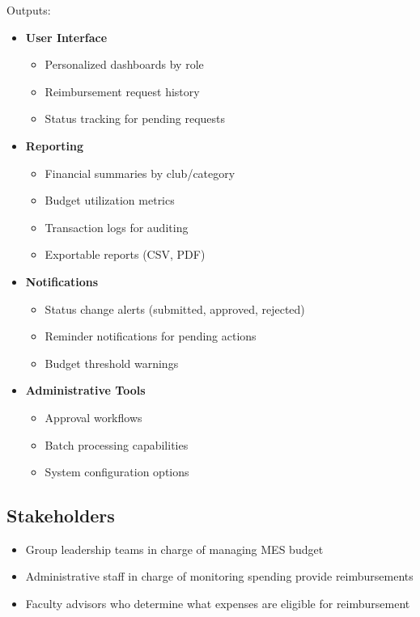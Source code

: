 \documentclass{article}
\begin{document}
Outputs:
\begin{itemize}
  \item \textbf{User Interface}
    \begin{itemize}
      \item Personalized dashboards by role
      \item Reimbursement request history
      \item Status tracking for pending requests
    \end{itemize}
  \item \textbf{Reporting}
    \begin{itemize}
      \item Financial summaries by club/category
      \item Budget utilization metrics
      \item Transaction logs for auditing
      \item Exportable reports (CSV, PDF)
    \end{itemize}
  \item \textbf{Notifications}
    \begin{itemize}
      \item Status change alerts (submitted, approved, rejected)
      \item Reminder notifications for pending actions
      \item Budget threshold warnings
    \end{itemize}
  \item \textbf{Administrative Tools}
    \begin{itemize}
      \item Approval workflows
      \item Batch processing capabilities
      \item System configuration options
    \end{itemize}
\end{itemize}

\subsection{Stakeholders}
\begin{itemize}
  \item Group leadership teams in charge of managing MES budget
  \item Administrative staff in charge of monitoring spending provide reimbursements
  \item Faculty advisors who determine what expenses are eligible for reimbursement
\end{itemize}
\end{document}
